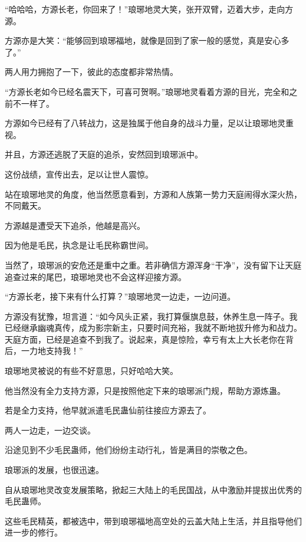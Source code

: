 
\begin{this_body}



“哈哈哈，方源长老，你回来了！”琅琊地灵大笑，张开双臂，迈着大步，走向方源。

方源亦是大笑：“能够回到琅琊福地，就像是回到了家一般的感觉，真是安心多了。”

两人用力拥抱了一下，彼此的态度都非常热情。

“方源长老如今已经名震天下，可喜可贺啊。”琅琊地灵看着方源的目光，完全和之前不一样了。

方源如今已经有了八转战力，这是独属于他自身的战斗力量，足以让琅琊地灵重视。

并且，方源还逃脱了天庭的追杀，安然回到琅琊派中。

这份战绩，宣传出去，足以让世人震惊。

站在琅琊地灵的角度，他当然愿意看到，方源和人族第一势力天庭闹得水深火热，不同戴天。

方源越是遭受天下追杀，他越是高兴。

因为他是毛民，执念是让毛民称霸世间。

当然了，琅琊派的安危还是重中之重。若非确信方源浑身“干净”，没有留下让天庭追查过来的尾巴，琅琊地灵也不会这样迎接方源。

“方源长老，接下来有什么打算？”琅琊地灵一边走，一边问道。

方源没有犹豫，坦言道：“如今风头正紧，我打算偃旗息鼓，休养生息一阵子。我已经继承幽魂真传，成为影宗新主，只要时间充裕，我就不断地拔升修为和战力。天庭方面，已经是追查不到我了。说起来，真是惊险，幸亏有太上大长老你在背后，一力地支持我！”

琅琊地灵被说的有些不好意思，只好哈哈大笑。

他当然没有全力支持方源，只是按照他定下来的琅琊派门规，帮助方源炼蛊。

若是全力支持，他早就派遣毛民蛊仙前往接应方源去了。

两人一边走，一边交谈。

沿途见到不少毛民蛊师，他们纷纷主动行礼，皆是满目的崇敬之色。

琅琊派的发展，也很迅速。

自从琅琊地灵改变发展策略，掀起三大陆上的毛民国战，从中激励并提拔出优秀的毛民蛊师。

这些毛民精英，都被选中，带到琅琊福地高空处的云盖大陆上生活，并且指导他们进一步的修行。


\end{this_body}
